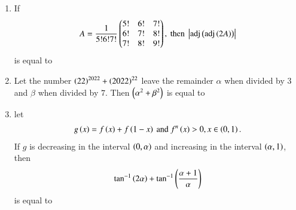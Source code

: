 \documentclass[journal]{IEEEtran}
\numberwithin{equation}{enumi}
\numberwithin{figure}{enumi}
\begin{document}
\begin{enumerate}
    \hfill{}

    \begin{enumerate}
    \end{enumerate}

    \item 
    If 
    \begin{align*}
        A = \frac{1}{5!6!7!}\begin{pmatrix}5! & 6! & 7!\\6! & 7! & 8!\\7! & 8! & 9!\end{pmatrix}, \text{ then } \left\vert\text{adj}\left(\text{adj}\left(2A\right)\right)\right\vert
    \end{align*}
    is equal to

    \hfill{}

    \begin{enumerate}
    \end{enumerate}

    \item 
    Let the number $\left(22\right)^{2022} + \left(2022\right)^{22}$ leave the remainder $\alpha$ when divided by $3$ and $\beta$ when divided by $7$. Then $\left(\alpha^2 + \beta^2\right)$ is equal to

    \hfill{}

    \begin{enumerate}
    \end{enumerate}

    \item 
    let 
    \begin{align*}
        g\left(x\right) = f\left(x\right) + f\left(1 - x\right) \text{ and } f^n\left(x\right) > 0, x \in \left(0, 1\right).
    \end{align*}
    If $g$ is decreasing in the interval $\left(0, \alpha\right)$ and increasing in the interval $\left(\alpha, 1\right)$, then 
    \begin{align*}
        \tan^{-1} {\left(2\alpha\right)} + \tan^{-1} {\left(\frac{\alpha + 1}{\alpha}\right)}
    \end{align*}
    is equal to


\end{enumerate}
\end{document}
